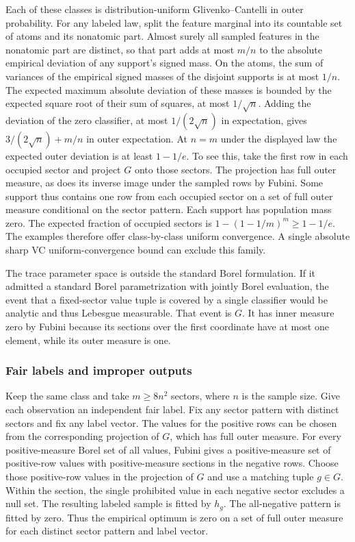\documentclass[11pt]{article}
\theoremstyle{definition}\newtheorem{definition}[theorem]{Definition}
\begin{document}
Each of these classes is distribution-uniform Glivenko--Cantelli in
outer probability. For any labeled law, split the feature marginal into
its countable set of atoms and its nonatomic part. Almost surely all
sampled features in the nonatomic part are distinct, so that part adds
at most $m/n$ to the absolute empirical deviation of any support's
signed mass. On the atoms, the sum of variances of the empirical signed
masses of the disjoint supports is at most $1/n$. The expected maximum
absolute deviation of these masses is bounded by the expected square
root of their sum of squares, at most $1/\sqrt n$. Adding the deviation
of the zero classifier, at most $1/(2\sqrt n)$ in expectation, gives
$3/(2\sqrt n)+m/n$ in outer expectation. At $n=m$ under the displayed
law the expected outer deviation is at least $1-1/e$. To see this,
take the first row in each occupied sector and project $G$ onto those
sectors. The projection has full outer measure, as does its inverse
image under the sampled rows by Fubini. Some support thus contains one
row from each occupied sector on a set of full outer measure conditional
on the sector pattern. Each support has population mass zero. The
expected fraction of occupied sectors is $1-(1-1/m)^m\ge1-1/e$.
The examples therefore offer class-by-class uniform convergence. A
single absolute sharp VC uniform-convergence bound can exclude this family.

The trace parameter space is outside the standard Borel formulation.
If it admitted a standard Borel parametrization with jointly Borel
evaluation, the event that a fixed-sector value tuple is covered by a
single classifier would be analytic and thus Lebesgue measurable. That
event is $G$. It has inner measure zero by Fubini because its sections
over the first coordinate have at most one element, while its outer
measure is one.

\subsubsection{Fair labels and improper outputs}

Keep the same class and take $m\ge8n^2$ sectors, where $n$ is the sample
size. Give each observation an independent fair label. Fix any sector
pattern with distinct sectors and fix any label vector. The values for
the positive rows can be chosen from the corresponding projection of $G$,
which has full outer measure. For every positive-measure Borel set of
all values, Fubini gives a positive-measure set of positive-row values
with positive-measure sections in the negative rows. Choose those
positive-row values in the projection of $G$ and use a matching tuple
$g\in G$. Within the section, the single prohibited value in each
negative sector excludes a null set. The resulting labeled sample is
fitted by $h_g$. The all-negative pattern is fitted by zero. Thus the
empirical optimum is zero on a set of full outer measure for each
distinct sector pattern and label vector.
\end{document}
